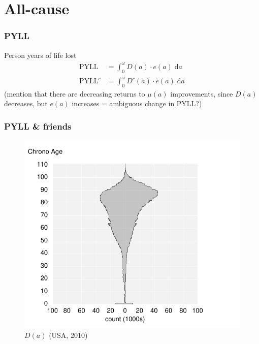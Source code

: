 \documentclass{beamer}
\newcommand{\dd}{\; \mathrm{d}}
\begin{document}
\section{All-cause}
\begin{frame}
\frametitle{PYLL}
Person years of life lost
\begin{align}
\text{PYLL} &= \int_0^\omega D(a) \cdot e(a) \dd a \\
\text{PYLL}^c &= \int_0^\omega D^c(a) \cdot e(a) \dd a
\end{align}
(mention that there are decreasing returns to $\mu(a)$ improvements, since
$D(a)$ decreases, but $e(a)$ increases = ambiguous change in PYLL?)
\end{frame}


\begin{frame}
\frametitle{PYLL \& friends}
\vspace{-1cm}
\begin{figure}[b]
    \centering
    \includegraphics[scale=.7]{Figures/f1_Da.pdf}
    \caption{$D(a)$ (USA, 2010)}
\end{figure} 
\end{frame}
\end{document}
